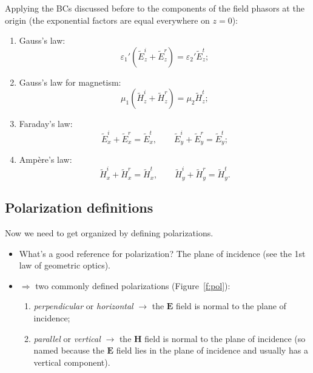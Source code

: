 \documentclass[11pt, oneside]{article}
\begin{document}
Applying the BCs discussed before to the components of the field phasors at the origin (the exponential factors are equal everywhere on $z = 0$):
\begin{enumerate}
	\item Gauss's law:
	\begin{equation}
		\label{e:bc_gauss}
		\varepsilon_1'\left(\tilde{E}^i_z + \tilde{E}^r_z\right) = \varepsilon_2'\tilde{E}^t_z;
	\end{equation}
	\item Gauss's law for magnetism:
	\begin{equation}
		\label{e:bc_gaussm}
		\mu_1\left(\tilde{H}^i_z + \tilde{H}^r_z\right) = \mu_2\tilde{H}^t_z;
	\end{equation}
	\item Faraday's law:
	\begin{equation}
		\label{e:bc_faraday}
		\tilde{E}^i_x + \tilde{E}^r_x = \tilde{E}^t_x, \qquad \tilde{E}^i_y + \tilde{E}^r_y = \tilde{E}^t_y;
	\end{equation}
	\item Amp\`ere's law:
	\begin{equation}
		\label{e:bc_ampere}
		\tilde{H}^i_x + \tilde{H}^r_x = \tilde{H}^t_x, \qquad \tilde{H}^i_y + \tilde{H}^r_y = \tilde{H}^t_y.
	\end{equation}
\end{enumerate}

\subsection{Polarization definitions}

Now we need to get organized by defining polarizations.
\begin{itemize}
	\item What's a good reference for polarization? The plane of incidence (see the 1st law of geometric optics).
	\item[] $\Rightarrow$ two commonly defined polarizations (Figure~\ref{f:pol}):
	\begin{enumerate}
		\item \emph{perpendicular} or \emph{horizontal} $\rightarrow$ the $\mathbf{E}$ field is normal to the plane of incidence;
		\item \emph{parallel} or \emph{vertical} $\rightarrow$ the $\mathbf{H}$ field is normal to the plane of incidence (so named because the $\mathbf{E}$ field lies in the plane of incidence and usually has a vertical component).
	\end{enumerate}
\end{itemize}
\end{document}
